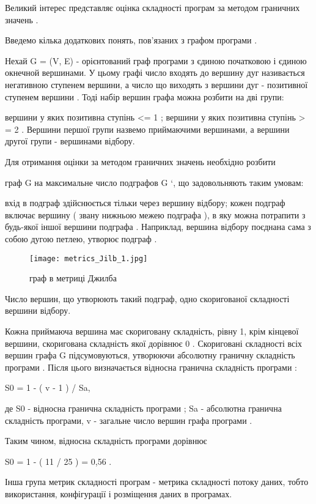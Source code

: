 Великий інтерес представляє оцінка складності програм за методом граничних значень .

Введемо кілька додаткових понять, пов'язаних з графом програми .

Нехай G = (V, E) - орієнтований граф програми з єдиною початковою і єдиною окнечной вершинами. У цьому графі число входять до вершину дуг називається негативною ступенем вершини, а число що виходять з вершини дуг - позитивної ступенем вершини . Тоді набір вершин графа можна розбити на дві групи:

вершини у яких позитивна ступінь \textless{}= 1 ;
вершини у яких позитивна ступінь \textgreater{} = 2 .
Вершини першої групи назвемо приймаючими вершинами, а вершини другої групи - вершинами відбору.

Для отримання оцінки за методом граничних значень необхідно розбити

граф G на максимальне число подграфов G `, що задовольняють таким умовам:

вхід в подграф здійснюється тільки через вершину відбору;
кожен подграф включає вершину ( звану нижньою межею подграфа ), в яку можна потрапити з будь-якої іншої вершини подграфа . Наприклад, вершина відбору поєднана сама з собою дугою петлею, утворює подграф .

\begin{figure}
    \centering
    \texttt{[image: metrics\_Jilb\_1.jpg]}
    \caption{граф в метриці Джилба}
    \label{fig:awesome_image}
\end{figure}

Число вершин, що утворюють такий подграф, одно скоригованої складності вершини відбору.

Кожна приймаюча вершина має скориговану складність, рівну 1, крім кінцевої вершини, скоригована складність якої дорівнює 0 . Скориговані складності всіх вершин графа G підсумовуються, утворюючи абсолютну граничну складність програми . Після цього визначається відносна гранична складність програми :

S0 = 1 - ( v - 1 ) / Sa,

де S0 - відносна гранична складність програми ; Sa - абсолютна гранична складність програми, v - загальне число вершин графа програми .

Таким чином, відносна складність програми дорівнює

S0 = 1 - ( 11 / 25 ) = 0,56 .

Інша група метрик складності програм - метрика складності потоку даних, тобто використання, конфігурації і розміщення даних в програмах.

